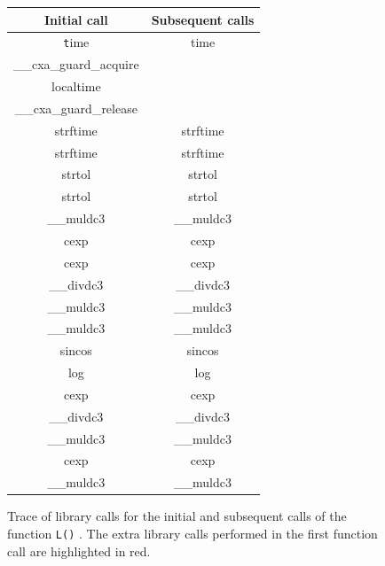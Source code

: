 \begin{figure}[h]
    \centering

    \begin{tabular}{cc}
    \toprule
    Initial call & Subsequent calls \\

    \midrule

    \texttt
        time                                    & time        \\
        {\color{red} \_\_cxa\_guard\_acquire }  &             \\
        {\color{red} localtime }                &             \\
        {\color{red} \_\_cxa\_guard\_release }  &             \\
        strftime                                & strftime    \\
        strftime                                & strftime    \\
        strtol                                  & strtol      \\
        strtol                                  & strtol      \\
        \_\_muldc3                              & \_\_muldc3  \\
        cexp                                    & cexp        \\
        cexp                                    & cexp        \\
        \_\_divdc3                              & \_\_divdc3  \\
        \_\_muldc3                              & \_\_muldc3  \\
        \_\_muldc3                              & \_\_muldc3  \\
        sincos                                  & sincos      \\
        log                                     & log         \\
        cexp                                    & cexp        \\
        \_\_divdc3                              & \_\_divdc3  \\
        \_\_muldc3                              & \_\_muldc3  \\
        cexp                                    & cexp        \\
        \_\_muldc3                              & \_\_muldc3  \\
    \bottomrule
    \end{tabular}

    \caption{Trace of library calls for the initial and subsequent calls of the function \texttt{L()} . The extra library calls performed in the first function call are highlighted in red.}
    \label{fig:l-calls}
\end{figure}
